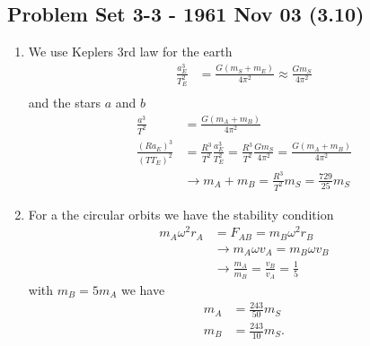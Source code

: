 \documentclass[10pt,a4paper]{book}
\theoremstyle{definition}
\begin{document}
\subsection{Problem Set 3-3 - 1961 Nov 03 (3.10)}
\begin{enumerate}[label=(\alph*)]
\item We use Keplers 3rd law for the earth
\begin{align}
    \frac{a_E^3}{T_E^2}&=\frac{G(m_S+m_E)}{4\pi^2}\approx\frac{Gm_S}{4\pi^2}\\
\end{align}
and the stars $a$ and $b$
\begin{align}
    \frac{a^3}{T^2}&=\frac{G(m_A+m_B)}{4\pi^2}\\
    \frac{(Ra_E)^3}{(TT_E)^2}&=\frac{R^3}{T^2}\frac{a_E^3}{T_E^2}=\frac{R^3}{T^2}\frac{Gm_S}{4\pi^2}=\frac{G(m_A+m_B)}{4\pi^2}\\
    &\rightarrow m_A+m_B = \frac{R^3}{T^2}m_S=\frac{729}{25}m_S
\end{align}

\item For a the circular orbits we have the stability condition
\begin{align}
    m_A\omega^2r_A&=F_{AB}=m_B\omega^2r_B\\
    &\rightarrow m_A\omega v_A=m_B\omega v_B\\
    &\rightarrow \frac{m_A}{m_B} =\frac{v_B}{v_A}=\frac{1}{5}
\end{align}
with $m_B=5m_A$ we have 
\begin{align}
    m_A&=\frac{243}{50}m_S\\
    m_B&=\frac{243}{10}m_S.
\end{align}
\end{enumerate}
\end{document}
